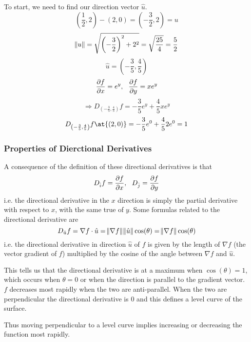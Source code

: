 \documentclass[12pt]{report}
\begin{document}
\begin{flushleft}
\begin{center}
    To start, we need to find our direction vector \(\hat{u}\).
    \[\left(\frac{1}{2}, 2\right) - (2, 0) = \left(-\frac{3}{2}, 2\right) = u\]
    \[\norm{u} = \sqrt{\left(-\frac{3}{2}\right)^2 + 2^2}
    = \sqrt{\frac{25}{4}} = \frac{5}{2}\]
    \[\hat{u} = \left(-\frac{3}{5}, \frac{4}{5}\right)\]
    \[\frac{\partial f}{\partial x} = e^y, \:\:\: \frac{\partial f}{\partial y} = xe^y\]
    \[\Rightarrow D_{\left(-\frac{3}{5}, \frac{4}{5}\right)}f = 
    -\frac{3}{5}e^y + \frac{4}{5}xe^y\]
    \[D_{\left(-\frac{3}{5}, \frac{4}{5}\right)}f\at{(2, 0)} = 
    -\frac{3}{5}e^0 + \frac{4}{5}2e^0 = 1\]
\end{center}

\subsubsection*{Properties of Dierctional Derivatives}

A consequence of the definition of these directional derivatives is that
\[D_{\hat{i}}f = \frac{\partial f}{\partial x}, \:\:\: D_{\hat{j}} = \frac{\partial f}{\partial y}\]
i.e. the directional derivative in the \(x\) direction is simply the partial
derivative with respect to \(x\), with the same true of \(y\). Some formulas
related to the directional derivative are
\[D_{\hat{u}}f = \nabla f\cdot\hat{u}
= \norm{\nabla f}\norm{\hat{u}}\cos(\theta) = \norm{\nabla f}\cos(\theta)\]
i.e. the directional derivative in direction \(\hat{u}\) of \(f\) is given by
the length of \(\nabla f\) (the vector gradient of \(f\)) multiplied by the
cosine of the angle between \(\nabla f\) and \(\hat{u}\). \par
This tells us that the directional derivative is at a maximum when
\(\cos(\theta) = 1\), which occurs when \(\theta = 0\) or when the direction
is parallel to the gradient vector. \(f\) decreases most rapidly when the two
are anti-parallel. When the two are perpendicular the directional derivative
is \(0\) and this defines a level curve of the surface. \par
Thus moving perpendicular to a level curve implies increasing or decreasing the
function most rapidly.

\end{flushleft}
\end{document}
